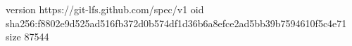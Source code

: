 version https://git-lfs.github.com/spec/v1
oid sha256:f8802e9d525ad516fb372d0b574df1d36b6a8efce2ad5bb39b7594610f5c4e71
size 87544
